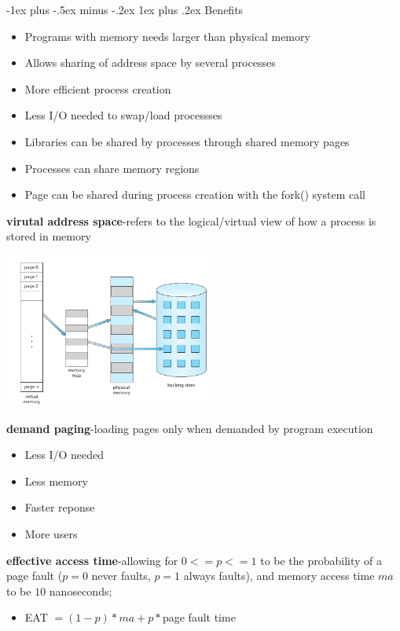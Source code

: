 \documentclass[8pt,landscape]{article}
\makeatletter
\renewcommand{\subsubsection}{\@startsection{subsubsection}{3}{0mm}%
                                {-1ex plus -.5ex minus -.2ex}%
                                {1ex plus .2ex}%
                                {\normalfont\tiny\bfseries}}
\makeatother
\begin{document}
\begin{multicols}{3}
\begin{tiny}
	\subsubsection{Benefits}
	\begin{itemize}[noitemsep]
		\item Programs with memory needs larger than physical memory
		\item Allows sharing of address space by several processes
		\item More efficient process creation
		\item Less I/O needed to swap/load processses
		\item Libraries can be shared by processes through shared memory pages
		\item Processes can share memory regions
		\item Page can be shared during process creation with the fork() system call
	\end{itemize}

	\textbf{virutal address space}-refers to the logical/virtual view of how a process is stored
	in memory
	
	\begingroup
		\centering
		\includegraphics[width=7cm]{virtualMem.png}
	\endgroup

	\textbf{demand paging}-loading pages only when demanded by program execution
	\begin{itemize}[noitemsep]
		\item Less I/O needed
		\item Less memory
		\item Faster reponse
		\item More users
	\end{itemize}

	\textbf{effective access time}-allowing for $0<=p<=1$ to be the probability of a page fault
	($p=0$ never faults, $p=1$ always faults), and memory access time $ma$ to be $10$ nanoseconds;
	\begin{itemize}[noitemsep]
		\item EAT $= (1-p)*ma+p*$page fault time
	\end{itemize}


\end{tiny}
\end{multicols}
\end{document}

